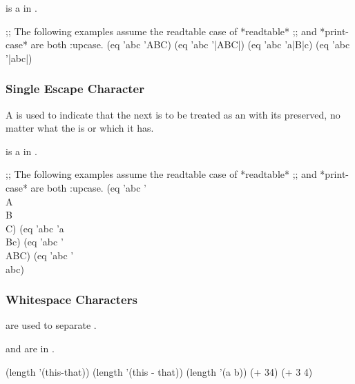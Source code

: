  is a  
in .


\code
 ;; The following examples assume the readtable case of *readtable* 
 ;; and *print-case* are both :upcase.
 (eq 'abc 'ABC) \EV {}
 (eq 'abc '|ABC|) \EV {}
 (eq 'abc 'a|B|c) \EV {}
 (eq 'abc '|abc|) \EV {}
\endcode

\subsubsection{Single Escape Character}

A  is used to indicate that 
the next  is to be treated as 
an  
with its  preserved,
no matter what the  is 
or which  it has.  

 is a   in .


\code
 ;; The following examples assume the readtable case of *readtable* 
 ;; and *print-case* are both :upcase.
 (eq 'abc '\\A\\B\\C) \EV {}
 (eq 'abc 'a\\Bc) \EV {}
 (eq 'abc '\\ABC) \EV {}
 (eq 'abc '\\abc) \EV {}
\endcode

\subsubsection{Whitespace Characters}

  are used to separate .

 and  are  
in .


\code
 (length '(this-that)) 
 (length '(this - that)) 
 (length '(a
           b)) 
 (+ 34) 
 (+ 3 4) 
\endcode
